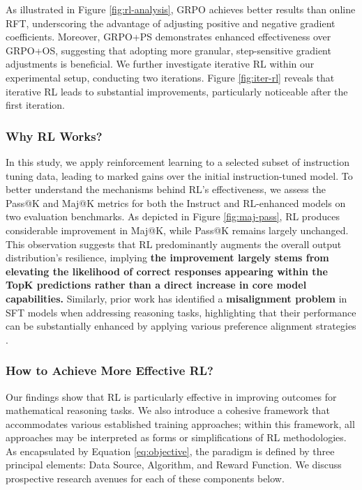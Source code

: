As illustrated in Figure \ref{fig:rl-analysis}, GRPO achieves better results than online RFT, underscoring the advantage of adjusting positive and negative gradient coefficients. Moreover, GRPO+PS demonstrates enhanced effectiveness over GRPO+OS, suggesting that adopting more granular, step-sensitive gradient adjustments is beneficial. We further investigate iterative RL within our experimental setup, conducting two iterations. Figure \ref{fig:iter-rl} reveals that iterative RL leads to substantial improvements, particularly noticeable after the first iteration.

\subsubsection{Why RL Works?} In this study, we apply reinforcement learning to a selected subset of instruction tuning data, leading to marked gains over the initial instruction-tuned model. To better understand the mechanisms behind RL's effectiveness, we assess the Pass@K and Maj@K metrics for both the Instruct and RL-enhanced models on two evaluation benchmarks. As depicted in Figure \ref{fig:maj-pass}, RL produces considerable improvement in Maj@K, while Pass@K remains largely unchanged. This observation suggests that RL predominantly augments the overall output distribution’s resilience, implying \textbf{the improvement largely stems from elevating the likelihood of correct responses appearing within the TopK predictions rather than a direct increase in core model capabilities.} Similarly, prior work \citep{wang2023making} has identified a \textbf{misalignment problem} in SFT models when addressing reasoning tasks, highlighting that their performance can be substantially enhanced by applying various preference alignment strategies \citep{yuan2023rrhf,song2023preference,wang2023making}.

\subsubsection{How to Achieve More Effective RL?}
\label{sec:effec_rl}
Our findings show that RL is particularly effective in improving outcomes for mathematical reasoning tasks. We also introduce a cohesive framework that accommodates various established training approaches; within this framework, all approaches may be interpreted as forms or simplifications of RL methodologies. As encapsulated by Equation \ref{eq:objective}, the paradigm is defined by three principal elements: Data Source, Algorithm, and Reward Function. We discuss prospective research avenues for each of these components below.


